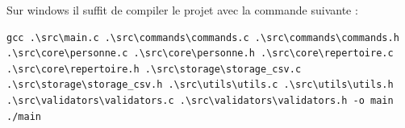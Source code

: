 \documentclass[12pt]{report}
\begin{document}
Sur windows il suffit de compiler le projet avec la commande suivante :

\begin{verbatim}
gcc .\src\main.c .\src\commands\commands.c .\src\commands\commands.h .\src\core\personne.c .\src\core\personne.h .\src\core\repertoire.c .\src\core\repertoire.h .\src\storage\storage_csv.c .\src\storage\storage_csv.h .\src\utils\utils.c .\src\utils\utils.h .\src\validators\validators.c .\src\validators\validators.h -o main
./main
\end{verbatim}
\end{document}
